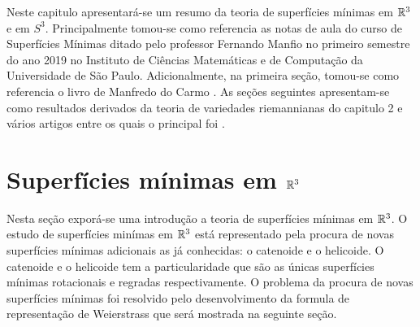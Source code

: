 Neste capitulo apresentará-se um resumo da teoria de superfícies mínimas em $\mathbb R^3$ e em $S^3$. 
Principalmente tomou-se como referencia as notas de aula do curso de Superfícies Mínimas ditado pelo professor Fernando Manfio no primeiro semestre do ano 2019 no Instituto de Ciências Matemáticas e de Computação da Universidade de São Paulo.
Adicionalmente, na primeira seção, tomou-se como referencia o livro de Manfredo do Carmo \cite{Carmo2010}.
As seções seguintes apresentam-se como resultados derivados da teoria de variedades riemannianas do capitulo 2 e vários artigos entre os quais o principal foi \cite{Brendle2013}.

\section{Superfícies mínimas em $\mathbb{R}^3$}
Nesta seção exporá-se uma introdução a teoria de superfícies mínimas em $\mathbb R^3$.
O estudo de superfícies minímas em $\mathbb R^3$ está representado pela procura de novas superfícies mínimas adicionais as já conhecidas: o catenoide e o helicoide.
O catenoide e o helicoide tem a particularidade que são as únicas superfícies mínimas rotacionais e regradas respectivamente.
O problema da procura de novas superfícies mínimas foi resolvido pelo desenvolvimento da formula de representação de Weierstrass que será mostrada na seguinte seção.
